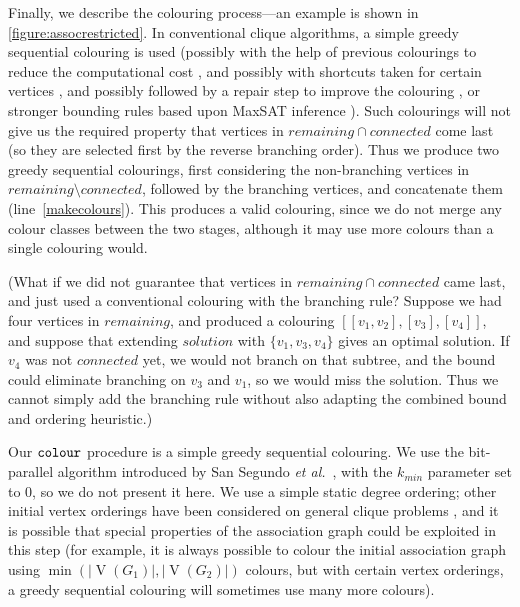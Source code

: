 \documentclass{llncs}
\newcommand{\lineref}[1]{line~\ref{#1}}
\begin{document}
Finally, we describe the colouring process---an example is shown in \cref{figure:assocrestricted}.
In conventional clique algorithms, a simple greedy sequential colouring is used (possibly with the
help of previous colourings to reduce the computational cost \cite{DBLP:conf/lion/NikolaevBS15}, and
possibly with shortcuts taken for certain vertices \cite{DBLP:journals/cor/SegundoT14}, and possibly
followed by a repair step to improve the colouring \cite{DBLP:conf/walcom/TomitaSHTW10}, or stronger
bounding rules based upon MaxSAT inference
\cite{DBLP:conf/ictai/LiFX13,DBLP:conf/lion/LiJX15,DBLP:journals/cor/SegundoNB15}).  Such colourings
will not give us the required property that vertices in $\mathit{remaining} \cap \mathit{connected}$
come last (so they are selected first by the reverse branching order). Thus we produce two greedy
sequential colourings, first considering the non-branching vertices in $\mathit{remaining} \setminus
\mathit{connected}$, followed by the branching vertices, and concatenate them
(\lineref{makecolours}). This produces a valid colouring, since we do not merge any colour classes
between the two stages, although it may use more colours than a single colouring would.

(What if we did not guarantee that vertices in $\mathit{remaining} \cap \mathit{connected}$ came
last, and just used a conventional colouring with the branching rule?  Suppose we had four vertices
in $\mathit{remaining}$, and produced a colouring $[[v_1, v_2], [v_3], [v_4]]$, and suppose that
extending $\mathit{solution}$ with $\{ v_1, v_3, v_4 \}$ gives an optimal solution. If $v_4$ was not
$\mathit{connected}$ yet, we would not branch on that subtree, and the bound could eliminate
branching on $v_3$ and $v_1$, so we would miss the solution. Thus we cannot simply add the branching
rule without also adapting the combined bound and ordering heuristic.)

Our $\FuncSty{colour}$ procedure is a simple greedy sequential colouring. We use the bit-parallel
algorithm introduced by San Segundo \textit{et al.}\ \cite{DBLP:journals/cor/SegundoRJ11}, with the
$k_{\mathit{min}}$ parameter set to $0$, so we do not present it here. We use a simple static degree
ordering; other initial vertex orderings have been considered on general clique problems
\cite{DBLP:journals/algorithms/Prosser12,DBLP:conf/lion/SegundoLB14}, and it is possible that
special properties of the association graph could be exploited in this step (for example, it is
always possible to colour the initial association graph using
$\operatorname{min}(\left|\operatorname{V}(G_1)\right|, \left|\operatorname{V}(G_2)\right|)$
colours, but with certain vertex orderings, a greedy sequential colouring will sometimes use
many more colours).
\end{document}
